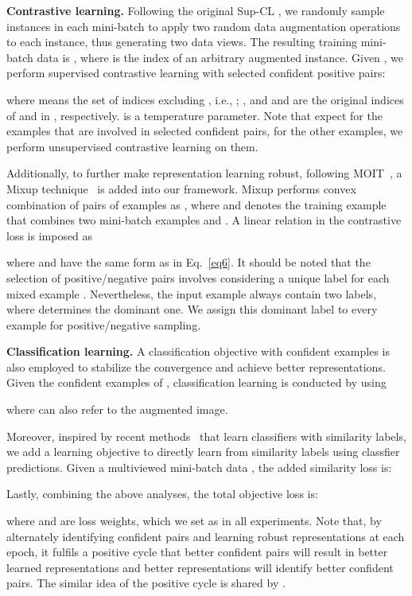 \documentclass[10pt,twocolumn,letterpaper]{article}
\newcommand{\myPara}[1]{\vspace{.05in}\noindent\textbf{#1}}
\begin{document}
\myPara{Contrastive learning.} Following the original Sup-CL \cite{Khosla2020}, we randomly sample  instances in each mini-batch to apply two random data augmentation operations to each instance, thus generating two data views. The resulting training mini-batch data is , where  is the index of an arbitrary augmented instance.
Given , we perform supervised contrastive learning with selected confident positive pairs:

where  means the set of indices excluding , i.e., ; , and  and  are the original indices of  and  in , respectively.  is a temperature parameter. Note that expect for the examples that are involved in selected confident pairs, for the other examples, we perform unsupervised contrastive learning \cite{chen2020simple} on them.

Additionally, to further make representation learning robust, following MOIT~\cite{Ortego2021}, a Mixup technique~\cite{zhang2018mixup} is added into our framework. Mixup performs convex combination of pairs of examples as , where 
 and  denotes the training example that combines two mini-batch examples  and . A linear relation in the contrastive loss is imposed as 

where   and  have the same
form as  in Eq.~\ref{eq6}. It should be noted that the selection of positive/negative
pairs involves considering a unique label for each mixed
example \cite{Ortego2021}. Nevertheless, the input example always contain
two labels, where  determines the dominant one. We assign this dominant label to every example for positive/negative sampling.

\myPara{Classification learning.}
A classification objective with confident examples is also employed to stabilize the convergence and achieve better representations. Given the confident examples of , classification learning is conducted by using

where  can also refer to the augmented image.

Moreover, inspired by recent methods~\cite{Wu2021icml,Hsu2019iclr} that learn classifiers with similarity labels, we add a learning objective to directly learn from similarity labels using classfier predictions. Given a multiviewed mini-batch data , the added similarity loss is: 


Lastly, combining the above analyses, the total objective loss is: 

where  and  are loss weights, which we set as  in all experiments. Note that, by alternately identifying confident pairs and learning robust representations at each epoch,  it fulfils a positive cycle that better confident pairs will result in better learned representations and better representations will identify better confident pairs. The similar idea of the positive cycle is shared by \cite{bai2020me}. 
\end{document}
